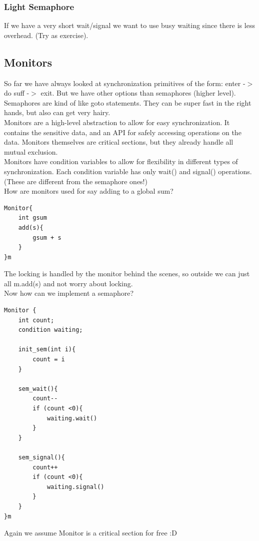 \documentclass[12pt]{article}
\theoremstyle{definition}
\begin{document}
\subsubsection{Light Semaphore}
If we have a very short wait/signal we want to use busy waiting since there is less overhead. (Try as exercise).
\\ \linebreak

\subsection{Monitors}
So far we have always looked at synchronization primitives of the form: enter -$>$ do suff -$>$ exit. But we have other options than semaphores (higher level). Semaphores are kind of like goto statements. They can be super fast in the right hands, but also can get very hairy.
\\ \linebreak
Monitors are a high-level abstraction to allow for easy synchronization. It contains the sensitive data, and an API for safely accessing operations on the data. Monitors themselves are critical sections, but they already handle all mutual exclusion.
\\ \linebreak
Monitors have condition variables to allow for flexibility in different types of synchronization. Each condition variable has only wait() and signal() operations. (These are different from the semaphore ones!) 
\\ \linebreak
How are monitors used for say adding to a global sum?
\begin{lstlisting}
Monitor{
	int gsum
	add(s){
		gsum + s
	}
}m
\end{lstlisting}
The locking is handled by the monitor behind the scenes, so outside we can just all m.add(s) and not worry about locking. 
\\ \linebreak
Now how can we implement a semaphore?
\begin{lstlisting}
Monitor {
	int count;
	condition waiting;
	
	init_sem(int i){
		count = i
	}
	
	sem_wait(){
		count--
		if (count <0){
			waiting.wait()
		}
	}
	
	sem_signal(){
		count++
		if (count <0){
			waiting.signal()
		}
	}
}m
\end{lstlisting}
Again we assume Monitor is a critical section for free :D 
\\ \linebreak
\end{document}
